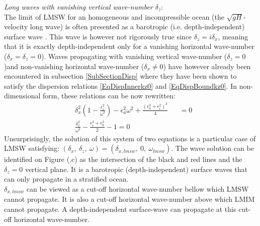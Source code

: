 \documentclass[a4paper,11pt]{article}
\begin{document}
\textit{Long waves with vanishing vertical wave-number $\delta_z$}:\\
The limit of LMSW for an homogeneous and incompressible ocean (the $\sqrt{gH}$-velocity long wave) is often presented as a barotropic (i.e. depth-independent) surface wave \citep{gill_1982}. This wave is however not rigorously true since $\delta_z=i\delta_x$, meaning that it is exactly depth-independent only for a vanishing horizontal wave-number ($\delta_x=\delta_z=0$). Waves propagating with vanishing vertical wave-number ($\delta_z=0$)and non-vanishing horizontal wave-number ($\delta_x\neq 0$) have however already been encountered in subsection \ref{SubSectionDisp} where they have been shown to satisfy the dispersion relations \ref{EqDispInnerkz0} and \ref{EqDispBoundkz0}. In non-dimensional form, these relations can be now rewritten:
\begin{subequations}
	\label{EqFullDisperkz0}
	\begin{alignat}{2}	
		\label{EqFullDisperkz0a}
 		& \delta_x^2 \left(1-\frac{\epsilon_i^2}{\omega^2}\right)
 		-\epsilon_a^2\omega^2+\frac{(\epsilon_a^2+\epsilon_i^2)^2}{4}
 		&&=0\\[3mm]
		\label{EqFullDisperkz0b}
		& \frac{\delta_x^2}{\omega^2}-\frac{\epsilon_i^2+\epsilon_a^2}{2}-1=0
	\end{alignat}
\end{subequations}
Unsurprisingly, the solution of this system of two equations is a particular case of LMSW satisfying: $(\delta_x,\ \delta_z,\ \omega)=(\delta_{x,lmsw},\ 0,\ \omega_{lmsw})$. The wave solution can be identified on Figure (.c) as the intersection of the black and red lines and the $\delta_z=0$ vertical plane. It is a barotropic (depth-independent) surface waves that can only propagate in a stratified ocean.\\ $\delta_{x,lmsw}$ can be viewed as a cut-off horizontal wave-number bellow which LMSW cannot propagate. It is also a cut-off horizontal wave-number above which LMIM cannot propagate. A depth-independent surface-wave can propagate at this cut-off horizontal wave-number.\\
\end{document}
